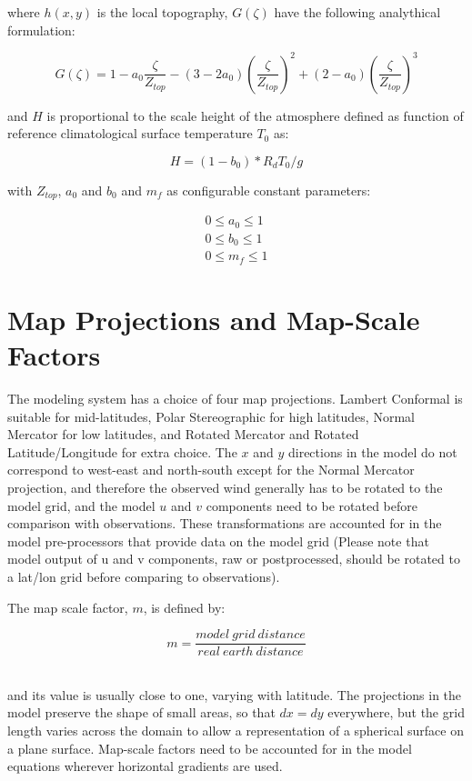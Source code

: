 where $h(x,y)$ is the local topography, $G(\zeta)$ have the
following analythical formulation:

\begin{equation}
G(\zeta) = 1 - a_0 \frac{\zeta}{Z_{top}} -
       (3 - 2 a_0)\left( \frac{\zeta}{Z_{top}} \right)^2 +
       (2 - a_0) \left( \frac{\zeta}{Z_{top}} \right)^3
\end{equation}

and $H$ is proportional to the scale height of the atmosphere defined as
function of reference climatological surface temperature $T_0$ as:

\begin{equation}
H = (1 - b_0) * R_d T_0 / g
\end{equation}

with $Z_{top}$, $a_0$ and $b_0$ and $m_f$ as configurable constant parameters:

\begin{eqnarray}
0 \le a_0 \le 1 \\
0 \le b_0 \le 1 \\
0 \le m_{f} \le 1
\end{eqnarray}

\section{Map Projections and Map-Scale Factors}
The modeling system has a
choice of four map projections. Lambert Conformal is suitable for mid-latitudes,
Polar Stereographic for high latitudes, Normal Mercator for low latitudes, and
Rotated Mercator and Rotated Latitude/Longitude for extra choice.
The $x$ and $y$ directions in the model do
not correspond to west-east and north-south except for the Normal Mercator
projection, and therefore the observed wind generally has to be rotated to the
model grid, and the model $u$ and $v$ components need to be rotated before
comparison with observations. These transformations are accounted for in the
model pre-processors that provide data on the model grid (Please note that
model output of u and v components, raw or postprocessed, should be rotated to a
lat/lon grid before comparing to observations).

The map scale factor, $m$, is defined by:

\begin{equation}
  m = \frac{model\:grid\:distance}{real\:earth\:distance}
\end{equation}

\noindent \\ and its value is usually close to one, varying with latitude. The
projections in the model preserve the shape of small areas, so that $dx=dy$
everywhere, but the grid length varies across the domain to allow a
representation of a spherical surface on a plane surface.
Map-scale factors need to be accounted for in the model equations wherever
horizontal gradients are used.

